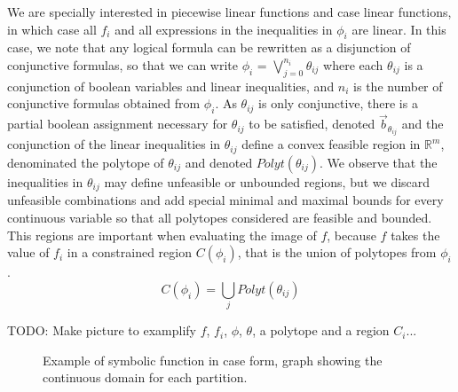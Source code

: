 We are specially interested in piecewise linear functions and case linear functions, in which case all $f_i$ and all expressions in the inequalities in $\phi_i$ are linear. In this case, we note that any logical formula can be rewritten as a disjunction of conjunctive formulas, so that we can write $\phi_i$ = $\bigvee_{j=0}^{n_i} \theta_{ij}$ where each $\theta_{ij}$ is a conjunction of boolean variables and  linear inequalities, and $n_i$ is the number of conjunctive formulas obtained from $\phi_i$. As $\theta_{ij}$ is only conjunctive, there is a partial boolean assignment necessary for $\theta_{ij}$ to be satisfied, denoted $\vec{b}_{\theta_{ij}}$ and the conjunction of the linear inequalities in $\theta_{ij}$ define a convex feasible region in $\mathbb{R}^m$, denominated the polytope of $\theta_{ij}$ and denoted $Polyt(\theta_{ij})$. We observe that the inequalities in $\theta_{ij}$ may define unfeasible or unbounded regions, but we discard unfeasible combinations and add special minimal and maximal bounds for every continuous variable so that all polytopes considered are feasible and bounded. This regions are important when evaluating the image of $f$, because $f$ takes the value of $f_i$ in a constrained region $C(\phi_i)$, that is the union of polytopes from $\phi_i$.
		$$C(\phi_i) = \bigcup_j Polyt(\theta_{ij})$$

TODO: Make picture to examplify $f$, $f_i$, $\phi$, $\theta$, a polytope and a region $C_i$...

\begin{figure}[h!t]
\center
{}
\caption{ Example of symbolic function in case form, graph showing the continuous domain for each partition.}
\label{fig:samplecase} 
\end{figure}


